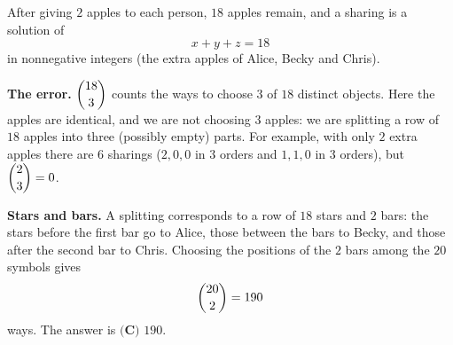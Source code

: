 After giving $2$ apples to each person, $18$ apples remain, and a sharing is a solution of
\[x+y+z=18\]
in nonnegative integers (the extra apples of Alice, Becky and Chris).

\textbf{The error.} $\dbinom{18}{3}$ counts the ways to choose $3$ of $18$ distinct objects. Here the apples are identical, and we are not choosing $3$ apples: we are splitting a row of $18$ apples into three (possibly empty) parts. For example, with only $2$ extra apples there are $6$ sharings ($2,0,0$ in $3$ orders and $1,1,0$ in $3$ orders), but $\dbinom23=0$.

\textbf{Stars and bars.} A splitting corresponds to a row of $18$ stars and $2$ bars: the stars before the first bar go to Alice, those between the bars to Becky, and those after the second bar to Chris. Choosing the positions of the $2$ bars among the $20$ symbols gives
\[\dbinom{20}{2}=190\]
ways. The answer is $\boxed{\textbf{(C) }190}$.
